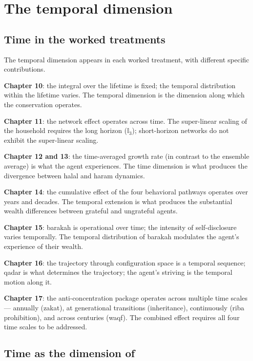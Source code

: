 \section{The temporal dimension}
\label{sec:unified-time}

\subsection{Time in the worked treatments}

The temporal dimension appears in each worked treatment, with
different specific contributions.

\textbf{Chapter 10}: the integral over the lifetime is fixed; the
temporal distribution within the lifetime varies. The temporal
dimension is the dimension along which the conservation operates.

\textbf{Chapter 11}: the network effect operates across time. The
super-linear scaling of the household requires the long horizon
($\mathbb{I}_3$); short-horizon networks do not exhibit the
super-linear scaling.

\textbf{Chapter 12 and 13}: the time-averaged growth rate (in
contrast to the ensemble average) is what the agent experiences.
The time dimension is what produces the divergence between halal
and haram dynamics.

\textbf{Chapter 14}: the cumulative effect of the four behavioral
pathways operates over years and decades. The temporal extension
is what produces the substantial wealth differences between
grateful and ungrateful agents.

\textbf{Chapter 15}: barakah is operational over time; the
intensity of self-disclosure varies temporally. The temporal
distribution of barakah modulates the agent's experience of
their wealth.

\textbf{Chapter 16}: the trajectory through configuration space is
a temporal sequence; qadar is what determines the trajectory; the
agent's striving is the temporal motion along it.

\textbf{Chapter 17}: the anti-concentration package operates
across multiple time scales --- annually (zakat), at generational
transitions (inheritance), continuously (riba prohibition), and
across centuries (waqf). The combined effect requires all four
time scales to be addressed.

\subsection{Time as the dimension of }

